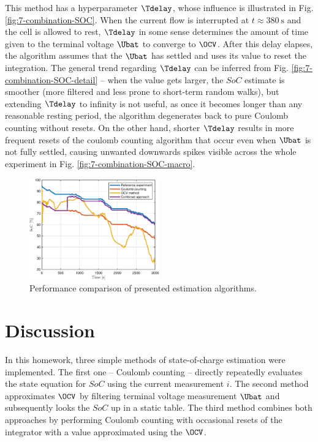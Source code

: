 This method has a hyperparameter $\Tdelay$, whose influence is illustrated in Fig. \ref{fig:7-combination-SOC}. When the current flow is interrupted at $t \approx \SI{380}{\second}$ and the cell is allowed to rest, $\Tdelay$ in some sense determines the amount of time given to the terminal voltage $\Ubat$ to converge to $\OCV$. After this delay elapses, the algorithm assumes that the $\Ubat$ has settled and uses its value to reset the integration.
The general trend regarding $\Tdelay$ can be inferred from Fig. \ref{fig:7-combination-SOC-detail} -- when the value gets larger,
the $SoC$ estimate is smoother (more filtered and less prone to short-term random walks), but extending $\Tdelay$ to infinity is not useful, as once it becomes longer than any reasonable resting period, the algorithm degenerates back to pure Coulomb counting without resets.
On the other hand, shorter $\Tdelay$ results in more frequent resets of the coulomb counting algorithm that occur even when $\Ubat$ is not fully settled, causing unwanted downwards spikes visible across the whole experiment in Fig. \ref{fig:7-combination-SOC-macro}.


\begin{figure}
    \centering
    \includegraphics[width=0.5\textwidth]{figures/7/comparison-SOC.eps}
    \caption{Performance comparison of presented estimation algorithms.}
    \label{fig:7-comparison-SOC}
\end{figure}

\section{Discussion}

In this homework, three simple methods of state-of-charge estimation were implemented. The first one -- Coulomb counting -- directly repeatedly evaluates the state equation for $SoC$ using the current measurement $i$. The second method approximates $\OCV$ by filtering terminal voltage measurement $\Ubat$ and subsequently looks the $SoC$ up in a static table. The third method combines both approaches by performing Coulomb counting with occasional resets of the integrator with a value approximated using the $\OCV$.

